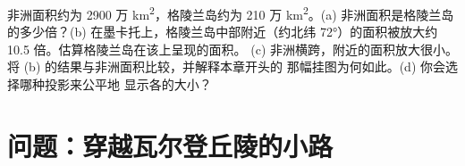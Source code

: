 \begin{exercise}[$\star\star\star$]\label{exo:g9:maps-of-the-earth:12}
非洲面积约为 2900 万 \unit{km^2}，格陵兰岛约为
210 万 \unit{km^2}。(a) 非洲面积是格陵兰岛的多少倍？(b)
在墨卡托上，格陵兰岛中部附近（约北纬 \ang{72}）的面积被放大约
10.5 倍。估算格陵兰岛在该上呈现的面积。
(c) 非洲横跨，附近的面积放大很小。
将 (b) 的结果与非洲面积比较，并解释本章开头的
那幅挂图为何如此。(d) 你会选择哪种投影来公平地
显示各的大小？
\end{exercise}

\section{问题：穿越瓦尔登丘陵的小路}

